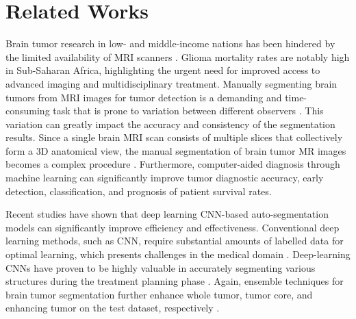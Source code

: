 \section{Related Works}
Brain tumor research in low- and middle-income nations has been hindered by the limited availability of MRI scanners \cite{murali2023bringing}. Glioma mortality rates are notably high in Sub-Saharan Africa, highlighting the urgent need for improved access to advanced imaging and multidisciplinary treatment. Manually segmenting brain tumors from MRI images for tumor detection is a demanding and time-consuming task that is prone to variation between different observers \cite{razzak2018efficient,sun2019drrnet}. This variation can greatly impact the accuracy and consistency of the segmentation results. Since a single brain MRI scan consists of multiple slices that collectively form a 3D anatomical view, the manual segmentation of brain tumor MR images becomes a complex procedure \cite{sun2019drrnet}. Furthermore, computer-aided diagnosis through machine learning can significantly improve tumor diagnostic accuracy, early detection, classification, and prognosis of patient survival rates.

Recent studies have shown that deep learning CNN-based auto-segmentation models can significantly improve efficiency and effectiveness. Conventional deep learning methods, such as CNN, require substantial amounts of labelled data for optimal learning, which presents challenges in the medical domain \cite{razzak2018efficient}. Deep-learning CNNs have proven to be highly valuable in accurately segmenting various structures during the treatment planning phase \cite{liang2020emerging,ibragimov2017segmentation,lustberg2018clinical,jackson2018deep,hu2016automatic,ibragimov2017combining}.
Again, ensemble techniques for brain tumor segmentation further enhance whole tumor, tumor core, and enhancing tumor on the test dataset, respectively \cite{khan2023hybrid,koirala2023automated}.